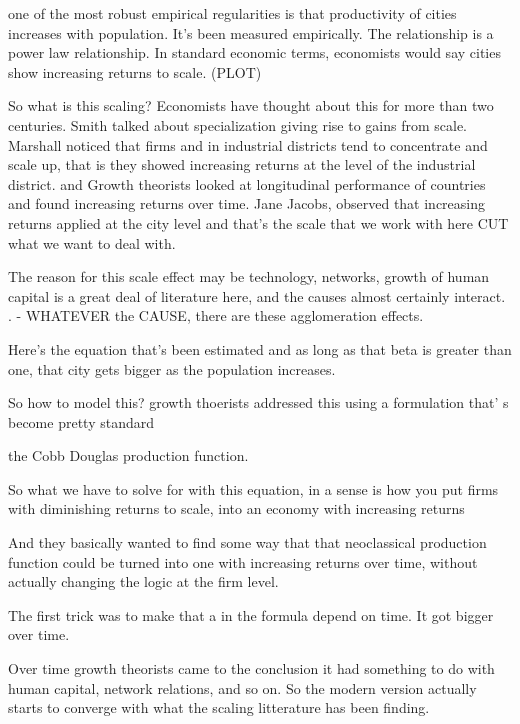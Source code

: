 \documentclass[]{article}
\begin{document}


one of the most robust empirical regularities is that 
productivity of cities increases with population. It's been measured empirically. The relationship is a power law relationship. In  standard economic terms, economists would say cities show increasing returns to scale. (PLOT)

So what is this  scaling?
Economists have thought about this for more than two centuries. Smith talked about specialization giving rise to gains from scale. 
Marshall noticed that firms and in industrial districts tend to concentrate and scale up, that is they showed increasing returns at the level of the industrial district. 
and Growth theorists looked at longitudinal performance of countries and found increasing returns over time.
Jane Jacobs, observed that increasing returns applied at the city level and that's the scale that we work with here CUT what we want to deal with.

The reason for this scale effect may be technology, networks, growth of human capital is a great deal of literature here, and the causes almost certainly interact. . - WHATEVER the CAUSE, there are these agglomeration effects. 

Here's the equation that's been estimated and as long as that beta is greater than one, that city gets bigger as the population increases.

So how to model this?
growth thoerists addressed this using a formulation that' s become pretty standard

the Cobb Douglas production function.  

So what we have to solve for with this equation, in a sense is how you put firms with diminishing returns to scale, into an economy with increasing returns

And they basically wanted to find some way that that neoclassical production function could be turned into one with increasing returns over time, without actually changing the logic at the firm level.

The first trick was to make that a in the formula depend on time. It got bigger over time.

Over time  growth theorists came to the conclusion it had something to do with human capital, network relations, and so on. So the modern version actually starts to converge with what the scaling litterature has been finding. 
\end{document}

